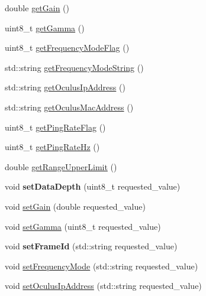 \begin{DoxyCompactItemize}
\item 
double \hyperlink{classOculusDriver_a38aff7fbcd3629ae98a534fb3d08fcb3}{get\+Gain} ()
\item 
uint8\+\_\+t \hyperlink{classOculusDriver_a82843006c51f2f444f0c945ff48f23f5}{get\+Gamma} ()
\item 
uint8\+\_\+t \hyperlink{classOculusDriver_a0aaac35eab767a90be0b1d789d2a00b4}{get\+Frequency\+Mode\+Flag} ()
\item 
std\+::string \hyperlink{classOculusDriver_aae6f2baf59064b855bebbd4bcd8ea169}{get\+Frequency\+Mode\+String} ()
\item 
std\+::string \hyperlink{classOculusDriver_a15bd2960efb1f5e93a994377cea09139}{get\+Oculus\+Ip\+Address} ()
\item 
std\+::string \hyperlink{classOculusDriver_a3006d773064e1707396a9ec2f7e4eae0}{get\+Oculus\+Mac\+Address} ()
\item 
uint8\+\_\+t \hyperlink{classOculusDriver_a3c5fb2a81d6f9366b82c247b682b890e}{get\+Ping\+Rate\+Flag} ()
\item 
uint8\+\_\+t \hyperlink{classOculusDriver_a6dfc4d095d04072851ce4c2c77a0d4bc}{get\+Ping\+Rate\+Hz} ()
\item 
double \hyperlink{classOculusDriver_a385145e8753891fc07f2e736a12be6d1}{get\+Range\+Upper\+Limit} ()
\item 
\mbox{\label{classOculusDriver_a6d8aa3ada8bf7a310ce7dc583acbc98e}} 
void {\bfseries set\+Data\+Depth} (uint8\+\_\+t requested\+\_\+value)
\item 
void \hyperlink{classOculusDriver_ad2c9b1948147a420a4669bb21ccead5f}{set\+Gain} (double requested\+\_\+value)
\item 
void \hyperlink{classOculusDriver_a3ce9cbc386f6617e80ef10036f3c6802}{set\+Gamma} (uint8\+\_\+t requested\+\_\+value)
\item 
\mbox{\label{classOculusDriver_a2b44dc0b05571bec4be32ca3e6bef179}} 
void {\bfseries set\+Frame\+Id} (std\+::string requested\+\_\+value)
\item 
void \hyperlink{classOculusDriver_ad0533517d029785c56329730082962cd}{set\+Frequency\+Mode} (std\+::string requested\+\_\+value)
\item 
void \hyperlink{classOculusDriver_a31d7bd517c4774d307192bfbaeeced2d}{set\+Oculus\+Ip\+Address} (std\+::string requested\+\_\+value)
\item 
\mbox{\label{classOculusDriver_a0727c7b97745f48b1edec6d2f7436dd7}} 

\end{DoxyCompactItemize}
